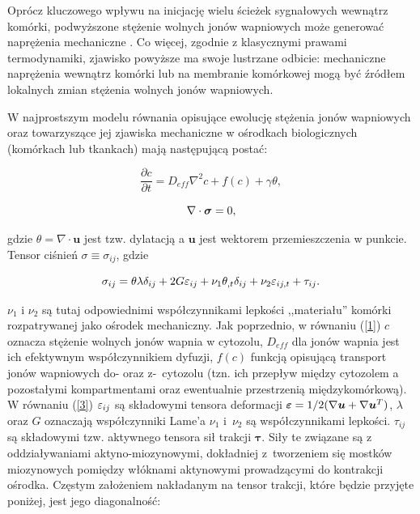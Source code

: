 Oprócz kluczowego wpływu na inicjację wielu ścieżek sygnałowych wewnątrz komórki, podwyższone stężenie wolnych jonów wapniowych może generować naprężenia mechaniczne \cite{Murray2007}. Co więcej, zgodnie z klasycznymi prawami termodynamiki, zjawisko powyższe ma swoje lustrzane odbicie: mechaniczne naprężenia wewnątrz komórki lub na membranie komórkowej mogą być źródłem lokalnych zmian stężenia wolnych jonów wapniowych. 

\medskip 
W najprostszym modelu \cite{Murray2007} równania opisujące ewolucję stężenia jonów wapniowych oraz towarzyszące jej zjawiska mechaniczne w ośrodkach biologicznych (komórkach lub tkankach) mają następującą postać: 

\begin{equation} \label{1}
\frac{\partial c}{\partial t} = D_{eff} \nabla^2  c + 
f(c) + \gamma \theta, 
\end{equation}

\begin{equation}  \label{2} \nabla \cdot {\mbox{\boldmath$\sigma$}} = 0, \end{equation}

\bigskip 

\noindent gdzie $\theta = \nabla \cdot {\boldsymbol u}$ jest tzw. dylatacją a ${\boldsymbol u}$ jest wektorem przemieszczenia w punkcie. 
Tensor ciśnień {\mbox{\boldmath$\sigma$}}$\equiv \sigma_{ij}$, gdzie 

\begin{equation} \label{3}
\sigma_{ij} = \theta \lambda \delta_{ij} + 2 G \varepsilon_{ij} + 
\nu_1 \theta_{,t} \delta_{ij} + \nu_2 \varepsilon_{ij,t} + \tau_{ij}.  
\end{equation}

\noindent $\nu_1$ i $\nu_2$ są tutaj odpowiednimi współczynnikami lepkości ,,materiału'' komórki rozpatrywanej jako ośrodek mechaniczny. Jak poprzednio, w  równaniu (\ref{1}) $c$ oznacza stężenie wolnych jonów wapnia w cytozolu,  $D_{eff}$ dla jonów wapnia jest ich efektywnym współczynnikiem dyfuzji, $f(c)$ funkcją opisującą transport jonów wapniowych do- oraz z-~cytozolu (tzn. ich przepływ między cytozolem a pozostałymi kompartmentami oraz ewentualnie przestrzenią międzykomórkową). W równaniu (\ref{3}) $\varepsilon_{ij}$ są składowymi tensora deformacji ${\boldsymbol {\varepsilon}}=1/2 (\nabla {\boldsymbol u} + \nabla {\boldsymbol u}^T)$, $\lambda$ oraz $G$ oznaczają współczynniki Lame'a $\nu_1$ i~$\nu_2$ są współczynnikami lepkości. $\tau_{ij}$ są składowymi tzw. aktywnego tensora sił trakcji ${\boldsymbol \tau}$. Siły te związane są z oddziaływaniami aktyno-miozynowymi, dokładniej z~tworzeniem się mostków miozynowych pomiędzy włóknami aktynowymi prowadzącymi do kontrakcji ośrodka. Częstym założeniem nakładanym na tensor trakcji, które będzie przyjęte poniżej, jest jego diagonalność: 

